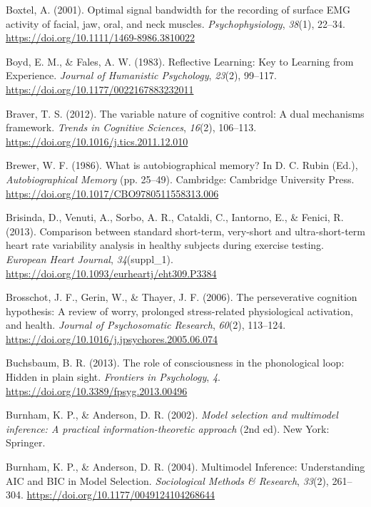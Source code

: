 \documentclass[a4paper,12pt,twoside,openright,oldfontcommands,final]{memoir}
\begin{document}
\leavevmode\hypertarget{ref-boxtel_optimal_2001}{}%
Boxtel, A. (2001). Optimal signal bandwidth for the recording of surface EMG activity of facial, jaw, oral, and neck muscles. \emph{Psychophysiology}, \emph{38}(1), 22--34. \url{https://doi.org/10.1111/1469-8986.3810022}

\leavevmode\hypertarget{ref-boyd_reflective_1983}{}%
Boyd, E. M., \& Fales, A. W. (1983). Reflective Learning: Key to Learning from Experience. \emph{Journal of Humanistic Psychology}, \emph{23}(2), 99--117. \url{https://doi.org/10.1177/0022167883232011}

\leavevmode\hypertarget{ref-braver_variable_2012}{}%
Braver, T. S. (2012). The variable nature of cognitive control: A dual mechanisms framework. \emph{Trends in Cognitive Sciences}, \emph{16}(2), 106--113. \url{https://doi.org/10.1016/j.tics.2011.12.010}

\leavevmode\hypertarget{ref-rubin_what_1986}{}%
Brewer, W. F. (1986). What is autobiographical memory? In D. C. Rubin (Ed.), \emph{Autobiographical Memory} (pp. 25--49). Cambridge: Cambridge University Press. \url{https://doi.org/10.1017/CBO9780511558313.006}

\leavevmode\hypertarget{ref-brisinda_comparison_2013}{}%
Brisinda, D., Venuti, A., Sorbo, A. R., Cataldi, C., Iantorno, E., \& Fenici, R. (2013). Comparison between standard short-term, very-short and ultra-short-term heart rate variability analysis in healthy subjects during exercise testing. \emph{European Heart Journal}, \emph{34}(suppl\_1). \url{https://doi.org/10.1093/eurheartj/eht309.P3384}

\leavevmode\hypertarget{ref-Brosschot2006}{}%
Brosschot, J. F., Gerin, W., \& Thayer, J. F. (2006). The perseverative cognition hypothesis: A review of worry, prolonged stress-related physiological activation, and health. \emph{Journal of Psychosomatic Research}, \emph{60}(2), 113--124. \url{https://doi.org/10.1016/j.jpsychores.2005.06.074}

\leavevmode\hypertarget{ref-buchsbaum_role_2013}{}%
Buchsbaum, B. R. (2013). The role of consciousness in the phonological loop: Hidden in plain sight. \emph{Frontiers in Psychology}, \emph{4}. \url{https://doi.org/10.3389/fpsyg.2013.00496}

\leavevmode\hypertarget{ref-burnham_model_2002}{}%
Burnham, K. P., \& Anderson, D. R. (2002). \emph{Model selection and multimodel inference: A practical information-theoretic approach} (2nd ed). New York: Springer.

\leavevmode\hypertarget{ref-burnham_multimodel_2004}{}%
Burnham, K. P., \& Anderson, D. R. (2004). Multimodel Inference: Understanding AIC and BIC in Model Selection. \emph{Sociological Methods \& Research}, \emph{33}(2), 261--304. \url{https://doi.org/10.1177/0049124104268644}
\end{document}

